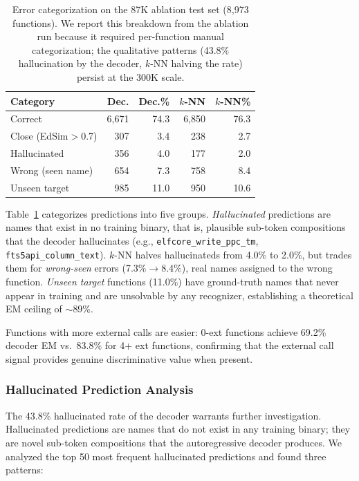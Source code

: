 \documentclass[sigconf,nonacm]{acmart}
\begin{document}
\begin{table}[t]
    \centering
    \caption{Error categorization on the 87K ablation test set (8{,}973 functions). We report this breakdown from the ablation run because it required per-function manual categorization; the qualitative patterns (43.8\% hallucination by the decoder, $k$-NN halving the rate) persist at the 300K scale.}
    \label{tab:errors}
    \footnotesize
    \begin{tabular}{lrrrr}
        \toprule
        \textbf{Category} & \textbf{Dec.} & \textbf{Dec.\%} & \textbf{$k$-NN} & \textbf{$k$-NN\%} \\
        \midrule
        Correct & 6,671 & 74.3 & 6,850 & 76.3 \\
        Close (EdSim${>}$0.7) & 307 & 3.4 & 238 & 2.7 \\
        Hallucinated & 356 & 4.0 & 177 & 2.0 \\
        Wrong (seen name) & 654 & 7.3 & 758 & 8.4 \\
        Unseen target & 985 & 11.0 & 950 & 10.6 \\
        \bottomrule
    \end{tabular}
\end{table}

Table~\ref{tab:errors} categorizes predictions into five groups. \emph{Hallucinated} predictions are names that exist in no training binary, that is, plausible sub-token compositions that the decoder hallucinates (e.g., \texttt{elfcore\_write\_ppc\_tm}, \texttt{fts5api\_column\_text}). $k$-NN halves hallucinateds from 4.0\% to 2.0\%, but trades them for \emph{wrong-seen} errors (7.3\%$\to$8.4\%), real names assigned to the wrong function. \emph{Unseen target} functions (11.0\%) have ground-truth names that never appear in training and are unsolvable by any recognizer, establishing a theoretical EM ceiling of ${\sim}$89\%.

Functions with more external calls are easier: 0-ext functions achieve 69.2\% decoder EM vs.\ 83.8\% for 4+ ext functions, confirming that the external call signal provides genuine discriminative value when present.

\subsubsection{Hallucinated Prediction Analysis}

The 43.8\% hallucinated rate of the decoder warrants further investigation. Hallucinated predictions are names that do not exist in any training binary; they are novel sub-token compositions that the autoregressive decoder produces. We analyzed the top 50 most frequent hallucinated predictions and found three patterns:
\end{document}
